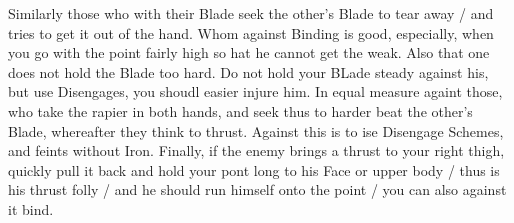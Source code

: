 \newpage


\newpage


Similarly those who with their Blade seek the other's Blade to tear
away / and tries to get it out of the hand. Whom against Binding is
good, especially, when you go with the point fairly high so hat he
cannot get the weak. Also that one does not hold the Blade too
hard. Do not hold your BLade steady against his, but use Disengages,
you shoudl easier injure him. In equal measure againt those, who take
the rapier in both hands, and seek thus to harder beat the other's
Blade, whereafter they think to thrust. Against this is to ise
Disengage Schemes, and feints without Iron. Finally, if the enemy
brings a thrust to your right thigh, quickly pull it back and hold
your pont long to his Face or upper body / thus is his thrust folly /
and he should run himself onto the point / you can also against it bind.



